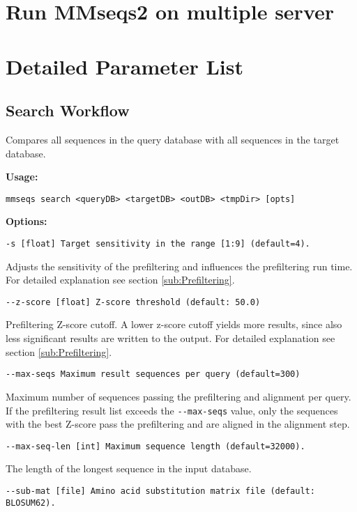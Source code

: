 \documentclass[11pt,a4paper]{scrreprt}
\begin{document}
\section{Run MMseqs2 on multiple server}
\section{Detailed Parameter List} \label{sec:Detailed-parameter-list}
\subsection{Search Workflow} \label{sub:Search-workflow}
Compares all sequences in the query database with all sequences in
the target database. 


\textbf{Usage:}


\texttt{mmseqs search <queryDB> <targetDB> <outDB> <tmpDir> {[}opts{]}}


\textbf{Options:}


\texttt{\small -s {[}float{]} Target sensitivity in the range {[}1:9{]} (default=4).}{\small \par}


Adjusts the sensitivity of the prefiltering and influences the prefiltering run time. For detailed explanation see section \ref{sub:Prefiltering}.


\texttt{\small -{}-z-score {[}float{]} Z-score threshold (default: 50.0)}{\small \par}


Prefiltering Z-score cutoff. A lower z-score cutoff yields more results, since also less significant results are written to the output. For detailed explanation see section \ref{sub:Prefiltering}.


\texttt{\small -{}-max-seqs Maximum result sequences per query (default=300)}{\small \par}


Maximum number of sequences passing the prefiltering and alignment per query. If the prefiltering result list exceeds the \texttt{-{}-max-seqs} value, only the sequences with the best Z-score pass the prefiltering and are aligned in the alignment step.


\texttt{\small -{}-max-seq-len {[}int{]} Maximum sequence length (default=32000).}{\small \par}


The length of the longest sequence in the input database.


\texttt{\small -{}-sub-mat {[}file{]} Amino acid substitution matrix file (default: BLOSUM62).}{\small \par}
\end{document}
